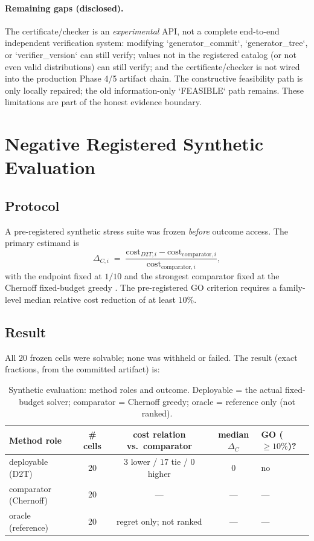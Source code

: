 \documentclass[11pt]{article}
\begin{document}
\paragraph{Remaining gaps (disclosed).}
The certificate/checker is an \emph{experimental} API, not a complete end-to-end independent verification system: modifying `generator\_commit`, `generator\_tree`, or `verifier\_version` can still verify; values not in the registered catalog (or not even valid distributions) can still verify; and the certificate/checker is not wired into the production Phase 4/5 artifact chain. The constructive feasibility path is only locally repaired; the old information-only `FEASIBLE` path remains. These limitations are part of the honest evidence boundary.

\section{Negative Registered Synthetic Evaluation}\label{sec:negative}

\subsection{Protocol}\label{sec:protocol}

A pre-registered synthetic stress suite was frozen \emph{before} outcome access. The primary estimand is
\[
\Delta_{C,i} \;=\; \frac{\mathrm{cost}_{D2T,i}-\mathrm{cost}_{\mathrm{comparator},i}}{\mathrm{cost}_{\mathrm{comparator},i}},
\]
with the endpoint fixed at $1/10$ and the strongest comparator fixed at the Chernoff fixed-budget greedy \cite{chernoff1972sequential}. The pre-registered GO criterion requires a family-level median relative cost reduction of at least $10\%$.

\subsection{Result}\label{sec:result}

All $20$ frozen cells were solvable; none was withheld or failed. The result (exact fractions, from the committed artifact) is:

\begin{table}[H]\centering
\caption{Synthetic evaluation: method roles and outcome. Deployable = the actual fixed-budget solver; comparator = Chernoff greedy; oracle = reference only (not ranked).}\label{tab:synthetic}
\begin{tabular}{lcccl}
\toprule
Method role & \# cells & cost relation vs.\ comparator & median $\Delta_C$ & GO ($\geq 10\%$)? \\
\midrule
deployable (D2T) & 20 & $3$ lower / $17$ tie / $0$ higher & $0$ & no \\
comparator (Chernoff) & 20 & --- & --- & --- \\
oracle (reference) & 20 & regret only; not ranked & --- & --- \\
\bottomrule
\end{tabular}
\end{table}
\end{document}
